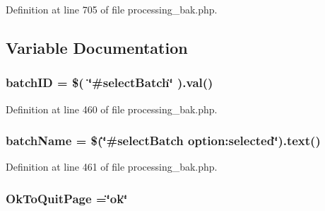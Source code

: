 Definition at line 705 of file processing\-\_\-bak.\-php.



\subsection{Variable Documentation}
\hypertarget{obsolete_2processing__bak_8php_a88c5bc4262b7c34f236357f5c53fc99b}{
\subsubsection[{batch\-I\-D}]{\setlength{\rightskip}{0pt plus 5cm}batch\-I\-D = \$( \char`\"{}\#select\-Batch\char`\"{} ).val()}}\label{obsolete_2processing__bak_8php_a88c5bc4262b7c34f236357f5c53fc99b}


Definition at line 460 of file processing\-\_\-bak.\-php.

\hypertarget{obsolete_2processing__bak_8php_aacb4c47c97ff6a475764ba2cf4090a32}{
\subsubsection[{batch\-Name}]{\setlength{\rightskip}{0pt plus 5cm}batch\-Name = \$(\char`\"{}\#select\-Batch option\-:selected\char`\"{}).text()}}\label{obsolete_2processing__bak_8php_aacb4c47c97ff6a475764ba2cf4090a32}


Definition at line 461 of file processing\-\_\-bak.\-php.

\hypertarget{obsolete_2processing__bak_8php_a737a9dd58b5139e64ee8903b481e9aa8}{
\subsubsection[{Ok\-To\-Quit\-Page}]{\setlength{\rightskip}{0pt plus 5cm}Ok\-To\-Quit\-Page =\char`\"{}ok\char`\"{}}}\label{obsolete_2processing__bak_8php_a737a9dd58b5139e64ee8903b481e9aa8}


